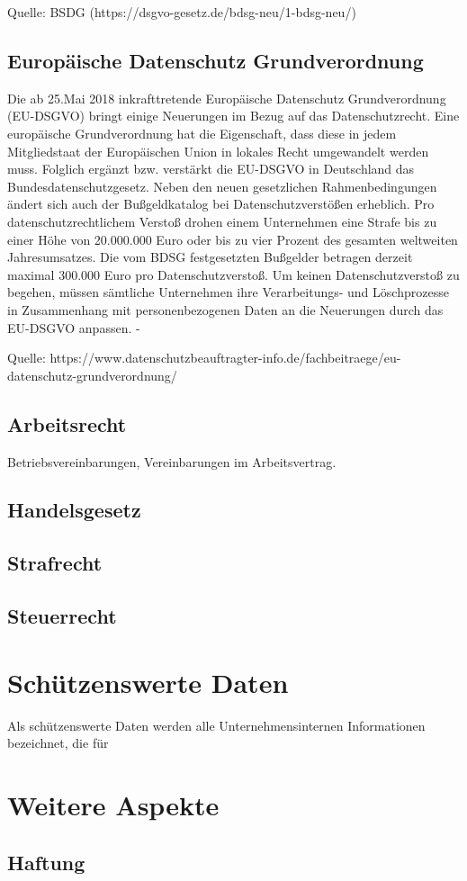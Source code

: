 Quelle: BSDG (https://dsgvo-gesetz.de/bdsg-neu/1-bdsg-neu/)

\subsection{Europäische Datenschutz Grundverordnung}
Die ab 25.Mai 2018 inkrafttretende Europäische Datenschutz Grundverordnung (EU-DSGVO) bringt einige Neuerungen im Bezug auf das Datenschutzrecht. Eine europäische Grundverordnung hat die Eigenschaft, dass diese in jedem Mitgliedstaat der Europäischen Union in lokales Recht umgewandelt werden muss. Folglich ergänzt bzw. verstärkt die EU-DSGVO in Deutschland das Bundesdatenschutzgesetz. Neben den neuen gesetzlichen Rahmenbedingungen ändert sich auch der Bußgeldkatalog bei Datenschutzverstößen erheblich. Pro datenschutzrechtlichem Verstoß drohen einem Unternehmen eine Strafe bis zu einer Höhe von 20.000.000 Euro oder bis zu vier Prozent des gesamten weltweiten Jahresumsatzes. Die vom BDSG festgesetzten Bußgelder betragen derzeit maximal 300.000 Euro pro Datenschutzverstoß.  Um keinen Datenschutzverstoß zu begehen, müssen sämtliche Unternehmen ihre Verarbeitungs- und Löschprozesse in Zusammenhang mit personenbezogenen Daten an die Neuerungen durch das EU-DSGVO anpassen. -

Quelle: https://www.datenschutzbeauftragter-info.de/fachbeitraege/eu-datenschutz-grundverordnung/

\subsection{Arbeitsrecht}
Betriebsvereinbarungen, Vereinbarungen im Arbeitsvertrag. 
\subsection{Handelsgesetz}
\subsection{Strafrecht}
\subsection{Steuerrecht}
\section {Schützenswerte Daten}

Als schützenswerte Daten werden alle Unternehmensinternen Informationen bezeichnet, die für 



\section {Weitere Aspekte}

\subsection{Haftung}













